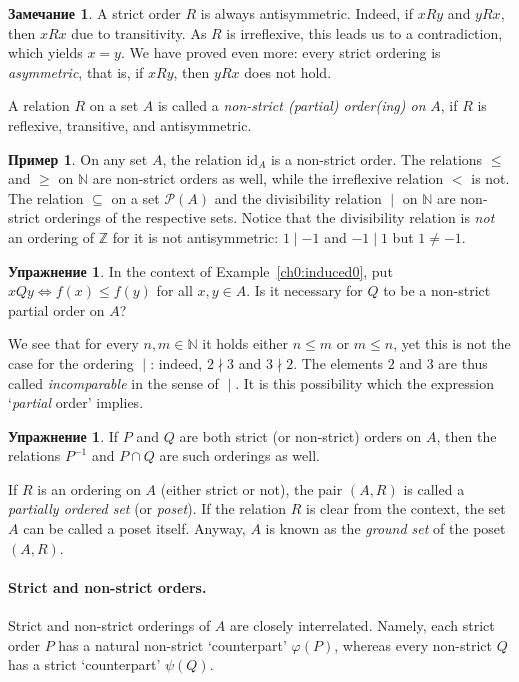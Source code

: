 \documentclass[12pt,notitlepage]{article}
\theoremstyle{plain}
\theoremstyle{definition}
\newtheorem{exc}[thm]{Упражнение}
\newtheorem{exm}[thm]{Пример}
\newtheorem{rem}[thm]{Замечание}
\theoremstyle{plain}
\newcommand{\N}{\mathbb{N}}
\newcommand{\Z}{\mathbb{Z}}
\newcommand{\sbs}{\subseteq}
\newcommand{\mP}{\mathcal{P}}
\renewcommand{\phi}{\varphi}
\newcommand{\id}{\mathrm{id}}
\newcommand{\1}{\mathbf{1}}
\newcommand{\0}{\mathbf{0}}
\newcommand{\dvd}{\mathop{\mid}}
\newcommand{\ndvd}{\mathop{\nmid}}
\begin{document}
\begin{rem}\label{ch0:sord_asym}
	A strict order $R$ is always antisymmetric. Indeed, if $x R y$ and $y R x$, then $x R x$ due to transitivity. As $R$ is irreflexive, this leads us to a contradiction, which yields $x = y$. We have proved even more: every strict ordering is \emph{asymmetric}, that is, if $x R y$, then $y R x$ does not hold.
\end{rem}

A relation $R$ on a set $A$ is called a \emph{non-strict (partial) order(ing) on} $A$, if $R$ is reflexive, transitive, and antisymmetric.

\begin{exm}
	On any set $A$, the relation $\id_A$ is a non-strict order. The relations ${\leq}$ and ${\geq}$ on $\N$ are non-strict orders as well, while the irreflexive relation ${<}$ is not. The relation ${\sbs}$ on a set $\mP(A)$ and the divisibility relation ${\dvd}$ on $\N$ are non-strict orderings of the respective sets. Notice that the divisibility relation is \emph{not}  an ordering of $\Z$ for it is not antisymmetric: $1 \dvd -1$ and $-1 \dvd 1$ but $1 \neq -1$.
\end{exm}

\begin{exc}
	In the context of Example~\ref{ch0:induced0}, put $x Q y \iff f(x) \leq f(y)$ for all $x, y \in A$. Is it necessary for $Q$ to be a non-strict partial order on $A$?
\end{exc}

We see that for every $n,m \in \N$ it holds either $n \leq m$ or $m \leq n$, yet this is not the case for the ordering ${\dvd}$: indeed, $2 \ndvd 3$ and $3 \ndvd 2$. The elements $2$ and $3$ are thus called \emph{incomparable} in the sense of ${\dvd}$. It is this possibility which the expression `\emph{partial} order' implies.

\begin{exc}
	If $P$ and $Q$ are both strict (or non-strict) orders on $A$, then the relations $P^{-1}$ and $P \cap Q$ are such orderings as well.
\end{exc}

If $R$ is an ordering on $A$ (either strict or not), the pair $(A,R)$ is called a \emph{partially ordered set} (or \emph{poset}). If the relation $R$ is clear from the context, the set $A$ can be called a poset itself. Anyway, $A$ is known as the \emph{ground set} of the poset $(A, R)$.

\paragraph{Strict and non-strict orders.}
Strict and non-strict orderings of $A$ are closely interrelated. Namely, each strict order $P$ has a natural non-strict `counterpart' $\phi(P)$, whereas every non-strict $Q$ has a strict `counterpart' $\psi(Q)$.
\end{document}
